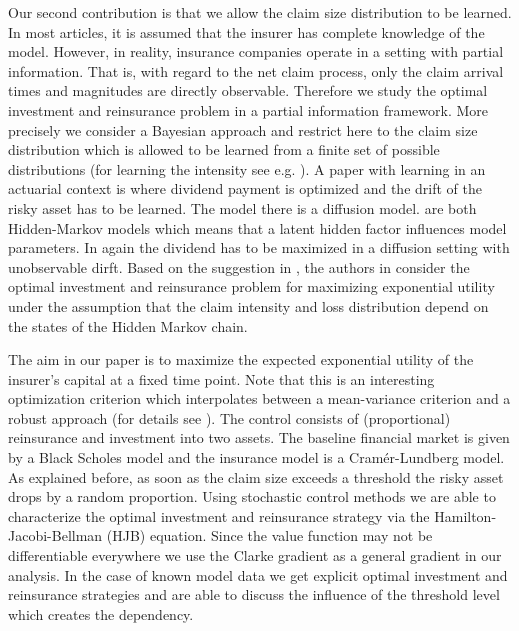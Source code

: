 \documentclass[reqno, 11pt]{amsart}%
\theoremstyle{definition}
\numberwithin{equation}{section} \numberwithin{theorem}{section}
\begin{document}
Our second contribution is that we allow the claim size distribution to be learned. In most articles, it is assumed  that the insurer has complete knowledge of the model. However, in reality, insurance companies operate in a setting with partial information. That is, with regard to the net claim process, only the claim arrival times and magnitudes are directly observable. Therefore we study the optimal investment and reinsurance problem in a partial information framework. More precisely we consider a Bayesian approach and restrict here to the claim size distribution which is allowed to be learned from a finite set of possible distributions (for learning the intensity see e.g. \cite{BaeuerleLeimcke2020}). 
A paper with learning in an actuarial context is \cite{LST14} where dividend payment is optimized and the drift of the risky asset has to be learned. The model there is a diffusion model. \cite{s15,LiangBayraktar2014} are both Hidden-Markov models which means that a latent hidden factor influences model parameters. In \cite{s15} again the dividend has to be maximized in a diffusion setting with unobservable dirft.   Based on the suggestion in \cite[p.\,165]{AsmussenAlbrecher2010}, the authors in \cite{LiangBayraktar2014} consider the optimal investment and reinsurance problem for maximizing exponential utility under the assumption that the claim intensity and loss distribution depend on the states of the Hidden Markov chain.

The aim in our paper is to maximize the expected  exponential utility  of the insurer's capital at a fixed time point. Note that this is an interesting optimization criterion which interpolates between a mean-variance criterion and a robust approach (for details see \cite{BaeuerleLeimcke2020}). The control consists of (proportional) reinsurance and investment into two assets. The baseline financial market is given by a Black Scholes model and the insurance model is a Cram\'er-Lundberg model. As explained before, as soon as the claim size exceeds a threshold the risky asset drops by a random proportion. Using stochastic control methods we are able to characterize the optimal investment and reinsurance strategy via the Hamilton-Jacobi-Bellman (HJB) equation. 
Since the value function may not be differentiable everywhere we use the Clarke gradient as a general gradient in our analysis. In the case of known model data we get explicit optimal investment and reinsurance strategies and are able to discuss the influence of the threshold level which creates the dependency.
\end{document}

